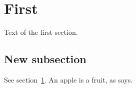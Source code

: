 \documentclass{article}
\begin{document}
\section{First}\label{first}
\startcontents
{}
Text of the first section.
\subsection{New subsection}
See section~\ref{first}. An apple is a \gls{fruit}, as \cite{able} says.


\printindex
\printglossary
\end{document}
